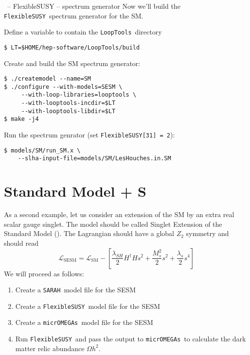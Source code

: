 \documentclass[11pt]{beamer}
\newcommand{\FlexibleSUSY}{\texttt{FlexibleSUSY}}
\newcommand{\Lagr}{\mathcal{L}}
\newcommand{\LoopTools}{\texttt{LoopTools}}
\newcommand{\micrOMEGAs}{\texttt{micrOMEGAs}}
\newcommand{\SARAH}{\texttt{SARAH}}
\newcommand{\SESM}{\text{SESM}}
\newcommand{\SM}{\text{SM}}
\begin{document}

\begin{frame}[fragile]{\insertsection\ -- FlexibleSUSY -- spectrum generator}
  Now we'll build the \FlexibleSUSY\ spectrum generator for the SM.

  \bigskip

  Define a variable to contain the \LoopTools\ directory
  \begin{lstlisting}
$ LT=$HOME/hep-software/LoopTools/build\end{lstlisting}%
  Create and build the SM spectrum generator:
  \begin{lstlisting}
$ ./createmodel --name=SM
$ ./configure --with-models=SESM \
     --with-loop-libraries=looptools \
     --with-looptools-incdir=$LT
     --with-looptools-libdir=$LT
$ make -j4\end{lstlisting}%
  Run the spectrum genrator (set \texttt{FlexibleSUSY[31] = 2}):
  \begin{lstlisting}
$ models/SM/run_SM.x \
    --slha-input-file=models/SM/LesHouches.in.SM\end{lstlisting}%
\end{frame}


\section{Standard Model + S}

\begin{frame}{\insertsection}
  As a second example, let us consider an extension of the SM by an
  extra real scalar gauge singlet. The model should be called Singlet
  Extension of the Standard Model (\SESM).  The Lagrangian should have
  a global $Z_2$ symmetry and should read
  \begin{equation*}
    \Lagr_{\SESM} = \Lagr_{\SM} - \left[\frac{\lambda_{SH}}{2} H^\dagger H s^2 + \frac{M_s^2}{2} s^2 + \frac{\lambda_s}{2} s^4\right]
  \end{equation*}
  We will proceed as follows:
  \begin{enumerate}
  \item Create a \SARAH\ model file for the SESM
  \item Create a \FlexibleSUSY\ model file for the SESM
  \item Create a \micrOMEGAs\ model file for the SESM
  \item Run \FlexibleSUSY\ and pass the output to \micrOMEGAs\ to
    calculate the dark matter relic abundance $\Omega h^2$.
  \end{enumerate}
\end{frame}
\end{document}
